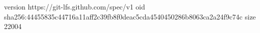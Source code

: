 version https://git-lfs.github.com/spec/v1
oid sha256:44455835c44716a11aff2c39fb8f0deac5cda4540450286b8063ca2a24f9c74c
size 22004
